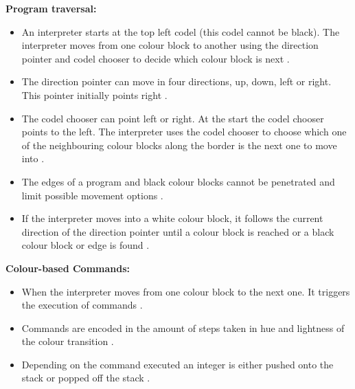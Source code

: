 \documentclass{article}
\begin{document}
\textbf{Program traversal:} 
    \begin{itemize}
        \item An interpreter starts at the top left codel (this codel cannot be black). The interpreter moves from one colour block to another using the direction pointer and codel chooser to decide which colour block is next \cite{Moosleitner}.
    \end{itemize}
    \begin{itemize}
        \item The direction pointer can move in four directions, up, down, left or right. This pointer initially points right \cite{Moosleitner}.
    \end{itemize}
    \begin{itemize}
        \item The codel chooser can point left or right. At the start the codel chooser points to the left. The interpreter uses the codel chooser to choose which one of the neighbouring colour blocks along the border is the next one to move into \cite{Moosleitner}.
    \end{itemize}
    \begin{itemize}
        \item The edges of a program and black colour blocks cannot be penetrated and limit possible movement options \cite{Moosleitner}.
    \end{itemize}
    \begin{itemize}
        \item If the interpreter moves into a white colour block, it follows the current direction of the direction pointer until a colour block is reached or a black colour block or edge is found \cite{Moosleitner}.
    \end{itemize}

\textbf{Colour-based Commands:}
\begin{itemize}
    \item When the interpreter moves from one colour block to the next one. It triggers the execution of commands \cite{Moosleitner}.
\end{itemize}
\begin{itemize}
    \item Commands are encoded in the amount of steps taken in hue and lightness of the colour transition \cite{Moosleitner}.
\end{itemize}
\begin{itemize}
    \item Depending on the command executed an integer is either pushed onto the stack or popped off the stack \cite{Moosleitner}.
\end{itemize}
\end{document}
